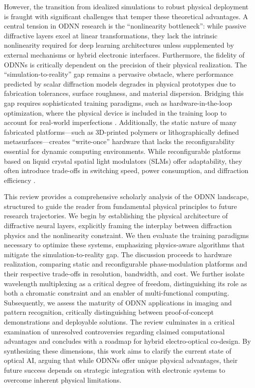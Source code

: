 However, the transition from idealized simulations to robust physical deployment is fraught with significant challenges that temper these theoretical advantages. A central tension in ODNN research is the ``nonlinearity bottleneck'': while passive diffractive layers excel at linear transformations, they lack the intrinsic nonlinearity required for deep learning architectures unless supplemented by external mechanisms or hybrid electronic interfaces. Furthermore, the fidelity of ODNNs is critically dependent on the precision of their physical realization. The ``simulation-to-reality'' gap remains a pervasive obstacle, where performance predicted by scalar diffraction models degrades in physical prototypes due to fabrication tolerances, surface roughness, and material dispersion. Bridging this gap requires sophisticated training paradigms, such as hardware-in-the-loop optimization, where the physical device is included in the training loop to account for real-world imperfections \citep{doi_10_1117_12_3013482_d44587c1}. Additionally, the static nature of many fabricated platforms---such as 3D-printed polymers or lithographically defined metasurfaces---creates ``write-once'' hardware that lacks the reconfigurability essential for dynamic computing environments. While reconfigurable platforms based on liquid crystal spatial light modulators (SLMs) offer adaptability, they often introduce trade-offs in switching speed, power consumption, and diffraction efficiency \citep{doi_10_1002_adom_202300561_c4d7a5b0}.

This review provides a comprehensive scholarly analysis of the ODNN landscape, structured to guide the reader from fundamental physical principles to future research trajectories. We begin by establishing the physical architecture of diffractive neural layers, explicitly framing the interplay between diffraction physics and the nonlinearity constraint. We then evaluate the training paradigms necessary to optimize these systems, emphasizing physics-aware algorithms that mitigate the simulation-to-reality gap. The discussion proceeds to hardware realization, comparing static and reconfigurable phase-modulation platforms and their respective trade-offs in resolution, bandwidth, and cost. We further isolate wavelength multiplexing as a critical degree of freedom, distinguishing its role as both a chromatic constraint and an enabler of multi-functional computing. Subsequently, we assess the maturity of ODNN applications in imaging and pattern recognition, critically distinguishing between proof-of-concept demonstrations and deployable solutions. The review culminates in a critical examination of unresolved controversies regarding claimed computational advantages and concludes with a roadmap for hybrid electro-optical co-design. By synthesizing these dimensions, this work aims to clarify the current state of optical AI, arguing that while ODNNs offer unique physical advantages, their future success depends on strategic integration with electronic systems to overcome inherent physical limitations.

